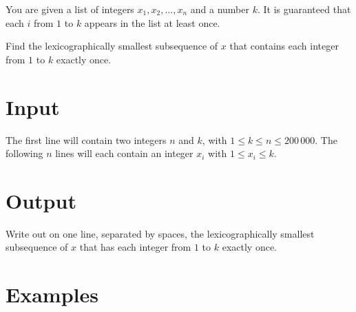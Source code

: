 

\noindent
You are given a list of integers $x_1, x_2, \ldots, x_n$ and a number $k$.
It is guaranteed that each $i$ from $1$ to $k$ appears in the list at least once.

Find the lexicographically smallest subsequence of $x$ that contains
each integer from $1$ to $k$ exactly once.

\section*{Input}

The first line will contain two integers $n$ and $k$, with
$1\le k\le n\le 200\,000$.
The following $n$ lines will each contain an integer $x_i$ with
$1\le x_i\le k$.

\section*{Output}

Write out on one line, separated by spaces, the lexicographically smallest
subsequence of $x$ that has each integer from $1$ to $k$ exactly once.

\section*{Examples}
